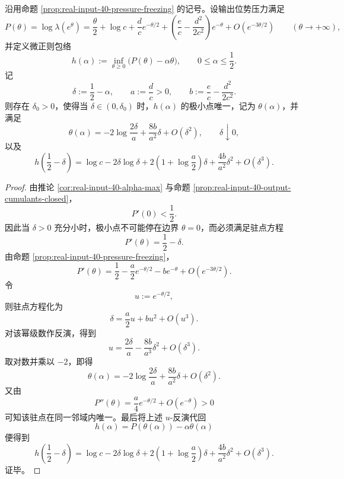 \begin{theorem}[零温微正则包络的对数尖点闭式]\label{thm:conclusion-realinput40-zero-temp-microcanonical-logcusp}
沿用命题 \ref{prop:real-input-40-pressure-freezing} 的记号。设输出位势压力满足
\[
P(\theta)=\log\lambda(e^\theta)
=\frac{\theta}{2}+\log c+\frac{d}{c}e^{-\theta/2}
+\left(\frac{e}{c}-\frac{d^2}{2c^2}\right)e^{-\theta}
+O(e^{-3\theta/2})
\qquad (\theta\to+\infty),
\]
并定义微正则包络
\[
h(\alpha):=\inf_{\theta\ge 0}\bigl(P(\theta)-\alpha\theta\bigr),
\qquad
0\le \alpha\le \frac12.
\]
记
\[
\delta:=\frac12-\alpha,
\qquad
a:=\frac{d}{c}>0,
\qquad
b:=\frac{e}{c}-\frac{d^2}{2c^2}.
\]
则存在 \(\delta_0>0\)，使得当 \(\delta\in(0,\delta_0)\) 时，\(h(\alpha)\) 的极小点唯一，记为 \(\theta(\alpha)\)，并满足
\[
\boxed{\;
\theta(\alpha)
=
-2\log\frac{2\delta}{a}
+\frac{8b}{a^2}\delta
+O(\delta^2),
\qquad
\delta\downarrow 0,
\;}
\]
以及
\[
\boxed{\;
h\!\left(\frac12-\delta\right)
=
\log c
-2\delta\log\delta
+2\left(1+\log\frac{a}{2}\right)\delta
+\frac{4b}{a^2}\delta^2
+O(\delta^3).
\;}
\]
\end{theorem}
\begin{proof}
由推论 \ref{cor:real-input-40-alpha-max} 与命题 \ref{prop:real-input-40-output-cumulants-closed}，
\[
P'(0)<\frac12.
\]
因此当 \(\delta>0\) 充分小时，极小点不可能停在边界 \(\theta=0\)，而必须满足驻点方程
\[
P'(\theta)=\frac12-\delta.
\]
由命题 \ref{prop:real-input-40-pressure-freezing}，
\[
P'(\theta)
=
\frac12-\frac{a}{2}e^{-\theta/2}-b e^{-\theta}+O(e^{-3\theta/2}).
\]
令
\[
u:=e^{-\theta/2},
\]
则驻点方程化为
\[
\delta=\frac{a}{2}u+b u^2+O(u^3).
\]
对该幂级数作反演，得到
\[
u=\frac{2\delta}{a}-\frac{8b}{a^3}\delta^2+O(\delta^3).
\]
取对数并乘以 \(-2\)，即得
\[
\theta(\alpha)
=
-2\log\frac{2\delta}{a}
+\frac{8b}{a^2}\delta
+O(\delta^2).
\]
又由
\[
P''(\theta)=\frac{a}{4}e^{-\theta/2}+O(e^{-\theta})>0
\]
可知该驻点在同一邻域内唯一。最后将上述 \(u\)-反演代回
\[
h(\alpha)=P(\theta(\alpha))-\alpha\theta(\alpha)
\]
便得到
\[
h\!\left(\frac12-\delta\right)
=
\log c
-2\delta\log\delta
+2\left(1+\log\frac{a}{2}\right)\delta
+\frac{4b}{a^2}\delta^2
+O(\delta^3).
\]
证毕。
\end{proof}

